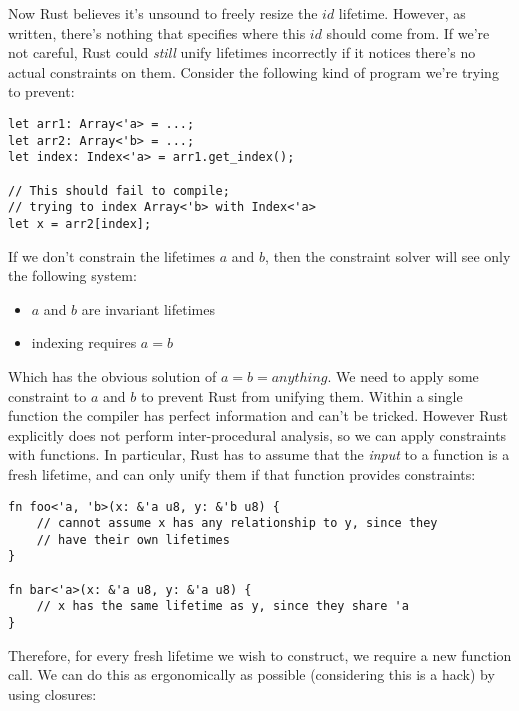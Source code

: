 Now Rust believes it's unsound to freely resize the $id$ lifetime. However, as
written, there's nothing that specifies where this $id$ should come from. If
we're not careful, Rust could \emph{still} unify lifetimes incorrectly if it notices
there's no actual constraints on them. Consider the following kind of program
we're trying to prevent:

\begin{verbatim}
let arr1: Array<'a> = ...;
let arr2: Array<'b> = ...;
let index: Index<'a> = arr1.get_index();

// This should fail to compile;
// trying to index Array<'b> with Index<'a>
let x = arr2[index];
\end{verbatim}

If we don't constrain the lifetimes $a$ and $b$, then the constraint solver
will see only the following system:

\begin{itemize}
 \item $a$ and $b$ are invariant lifetimes
 \item indexing requires $a = b$
\end{itemize}

Which has the obvious solution of $a = b = anything$. We need to apply some
constraint to $a$ and $b$ to prevent Rust from unifying them. Within a single
function the compiler has perfect information and can't be tricked. However
Rust explicitly does not perform inter-procedural analysis, so we can apply
constraints with functions. In particular, Rust has to assume that the \emph{input}
to a function is a fresh lifetime, and can only unify them if that function
provides constraints:

\begin{verbatim}
fn foo<'a, 'b>(x: &'a u8, y: &'b u8) {
    // cannot assume x has any relationship to y, since they
    // have their own lifetimes
}

fn bar<'a>(x: &'a u8, y: &'a u8) {
    // x has the same lifetime as y, since they share 'a
}
\end{verbatim}

Therefore, for every fresh lifetime we wish to construct, we require a new
function call. We can do this as ergonomically as possible (considering this
is a hack) by using closures:

